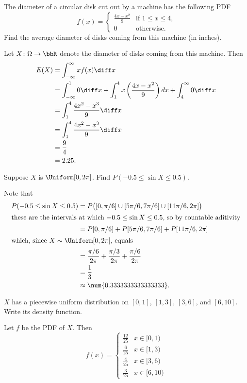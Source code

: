 \begin{problem}[Handout 12, \# 8]
  The diameter of a circular disk cut out by a machine has the following
  PDF
  \[
    f(x)=%
    \begin{cases}
      \frac{4x-x^2}{9}&\text{if \(1\leq x\leq 4\),}\\
      0&\text{otherwise.}
    \end{cases}
  \]
  Find the average diameter of disks coming from this machine (in inches).
\end{problem}
\begin{solution}
  Let \(X\colon\Omega\to\bbR\) denote the diameter of disks coming from
  this machine. Then
  \begin{align*}
    E(X) &=\int_{-\infty}^\infty xf(x) \diff x\\
         &=\int_{-\infty}^1 0\diff x%
           +\int_1^4 x \left(\frac{4x-x^2}{9}\right) dx%
           +\int_4^\infty 0\diff x\\
         &=\int_1^4 \frac{4x^2-x^3}{9} \diff x\\
         &=\int_1^4 \frac{4x^2-x^3}{9} \diff x\\
         &=\frac{9}{4}\\
         &=2.25.
  \end{align*}
\end{solution}
\newpage

\begin{problem}[Handout 12, \# 9]
  Suppose \(X\) is \(\Uniform[0,2 \pi]\). Find
  \(P(-0.5\leq \sin X\leq 0.5)\).
\end{problem}
\begin{solution}
  Note that
  \begin{align*}
    P(-0.5\leq\sin X\leq 0.5)
    &=P\bigl([0,\pi/6]\cup[5\pi/6,7\pi/6]\cup[11\pi/6,2\pi]\bigr)\\
    \intertext{these are the intervals at which \(-0.5\leq \sin X\leq
    0.5\), so by countable aditivity}
    &=P[0,\pi/6]+P[5\pi/6,7\pi/6]+P[11\pi/6,2\pi]\\
    \intertext{which, since \(X\sim\Uniform[0,2\pi]\), equals}
    &=\frac{\pi/6}{2\pi}+\frac{\pi/3}{2\pi}+\frac{\pi/6}{2\pi}\\
    &=\frac{1}{3}\\
    &\approx\num{0.3333333333333333}.
  \end{align*}
\end{solution}
\newpage

\begin{problem}[Handout 12, \# 13]
  \(X\) has a piecewise uniform distribution on \([0,1]\), \([1,3]\),
  \([3,6]\), and \([6,10]\). Write its density function.
\end{problem}
\begin{solution}
  Let $f$ be the PDF of $X$. Then
  \[
    f(x) =
    \begin{cases}
      \frac{12}{25}&x\in[0,1)\\
      \frac{6}{25}&x\in[1,3)\\
      \frac{4}{25}&x\in[3,6)\\
      \frac{3}{25}&x\in[6,10)
    \end{cases}
  \]
\end{solution}
\newpage

